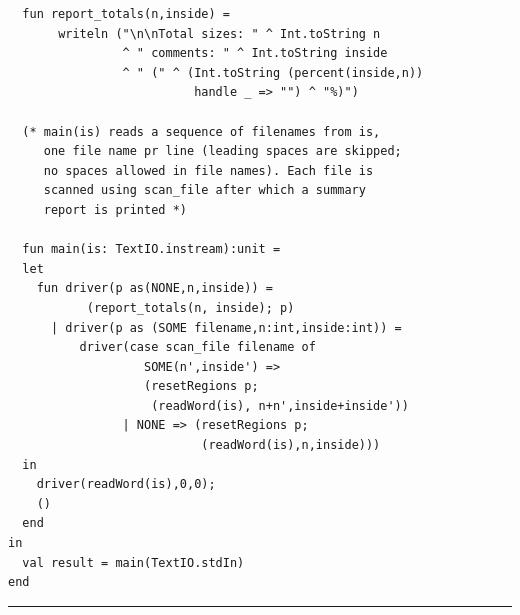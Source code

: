 \documentclass[12pt]{book}
\begin{document}
\begin{verbatim}
  fun report_totals(n,inside) = 
       writeln ("\n\nTotal sizes: " ^ Int.toString n
                ^ " comments: " ^ Int.toString inside
                ^ " (" ^ (Int.toString (percent(inside,n)) 
                          handle _ => "") ^ "%)")

  (* main(is) reads a sequence of filenames from is,
     one file name pr line (leading spaces are skipped;
     no spaces allowed in file names). Each file is 
     scanned using scan_file after which a summary
     report is printed *)

  fun main(is: TextIO.instream):unit =
  let 
    fun driver(p as(NONE,n,inside)) = 
           (report_totals(n, inside); p)
      | driver(p as (SOME filename,n:int,inside:int)) =
          driver(case scan_file filename of
                   SOME(n',inside') =>
                   (resetRegions p;
                    (readWord(is), n+n',inside+inside'))
                | NONE => (resetRegions p;
                           (readWord(is),n,inside)))
  in
    driver(readWord(is),0,0);
    ()
  end
in 
  val result = main(TextIO.stdIn)
end
\end{verbatim}
\hrule
\bigskip
\end{document}
